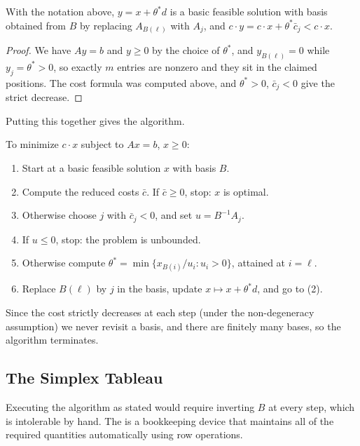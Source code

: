 \begin{theorem}
    With the notation above, $y = x + \theta^* d$ is a basic feasible solution with basis obtained from $B$ by replacing $A_{B(\ell)}$ with $A_j$, and $c\cdot y = c\cdot x + \theta^*\bar c_j < c\cdot x$.
\end{theorem}
\begin{proof}
    We have $Ay = b$ and $y \geq 0$ by the choice of $\theta^*$, and $y_{B(\ell)} = 0$ while $y_j = \theta^* > 0$, so exactly $m$ entries are nonzero and they sit in the claimed positions. The cost formula was computed above, and $\theta^* > 0$, $\bar c_j < 0$ give the strict decrease.
\end{proof}

Putting this together gives the algorithm.

\begin{definition}
    To minimize $c\cdot x$ subject to $Ax = b$, $x \geq 0$:
    \begin{enumerate}[label=(\arabic*)]
        \item Start at a basic feasible solution $x$ with basis $B$.
        \item Compute the reduced costs $\bar c$. If $\bar c \geq 0$, stop: $x$ is optimal.
        \item Otherwise choose $j$ with $\bar c_j < 0$, and set $u = B^{-1}A_j$.
        \item If $u \leq 0$, stop: the problem is unbounded.
        \item Otherwise compute $\theta^* = \min\{x_{B(i)}/u_i : u_i > 0\}$, attained at $i = \ell$.
        \item Replace $B(\ell)$ by $j$ in the basis, update $x \mapsto x + \theta^* d$, and go to (2).
    \end{enumerate}
\end{definition}

Since the cost strictly decreases at each step (under the non-degeneracy assumption) we never revisit a basis, and there are finitely many bases, so the algorithm terminates.

\subsection{The Simplex Tableau}

Executing the algorithm as stated would require inverting $B$ at every step, which is intolerable by hand. The  is a bookkeeping device that maintains all of the required quantities automatically using row operations.

